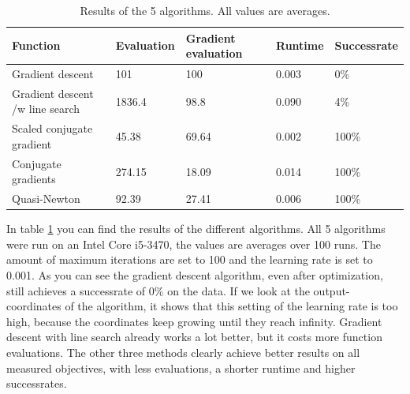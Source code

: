 \documentclass{article}
\begin{document}
\begin{table}[H]
	\centering
	\begin{tabular}{| l | l | l | l | l |}
		\hline
		Function                        & Evaluation  & Gradient evaluation & Runtime & Successrate \\ \hline 
		Gradient descent                & 101         & 100  & 0.003          & 0\% \\ \hline
		Gradient descent /w line search & 1836.4      & 98.8   & 0.090          & 4\% \\ \hline
		Scaled conjugate gradient       & 45.38        & 69.64  & 0.002  & 100\% \\ \hline
		Conjugate gradients             & 274.15        & 18.09 & 0.014        & 100\% \\ \hline
		Quasi-Newton                    & 92.39        & 27.41 & 0.006  & 100\% \\ \hline
	\end{tabular}
	\caption{Results of the 5 algorithms. All values are averages.}
	\label{tab:results}
\end{table}

In table \ref{tab:results} you can find the results of the different algorithms. All 5 algorithms were run on an Intel Core i5-3470, the values are averages over 100 runs. 
The amount of maximum iterations are set to 100 and the learning rate is set to 0.001.
As you can see the gradient descent algorithm, even after optimization, still achieves a successrate of 0\% on the data. If we look at the output-coordinates of the algorithm, it shows that this setting of the learning rate is too high, because the coordinates keep growing until they reach infinity. Gradient descent with line search already works a lot better, but it costs more function evaluations. The other three methods clearly achieve better results on all measured objectives, with less evaluations, a shorter runtime and higher successrates.
\end{document}
